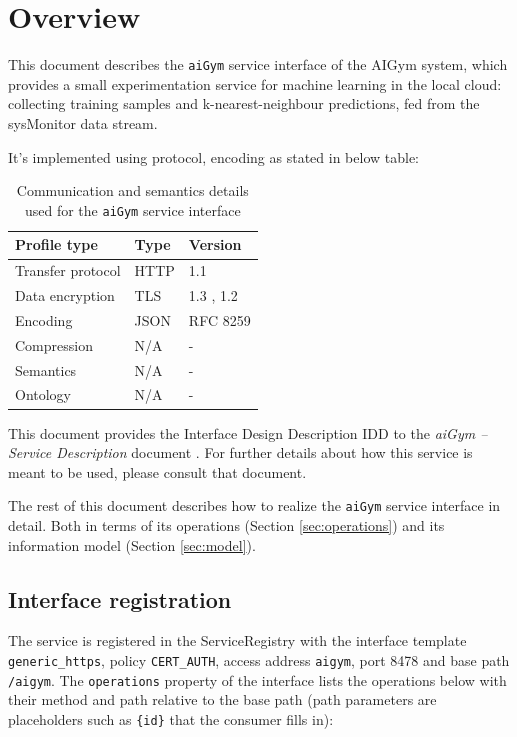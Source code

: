 \documentclass[a4paper]{arrowhead}
\begin{document}
\section{Overview}
\label{sec:overview}

This document describes the \texttt{aiGym} service interface of the AIGym system, which provides a small experimentation service for machine learning in the local cloud: collecting training samples and k-nearest-neighbour predictions, fed from the sysMonitor data stream.

It's implemented using protocol, encoding as stated in below table:
\begin{table}[ht!]
  \centering
  \begin{tabular}{|l|l|l|}
    \hline
    \rowcolor{gray!33} Profile type & Type & Version \\ \hline
    Transfer protocol & HTTP & 1.1 \cite{rfc9112} \\ \hline
    Data encryption & TLS & 1.3 \cite{rfc8446}, 1.2 \cite{rfc5246} \\ \hline
    Encoding & JSON & RFC 8259 \cite{rfc8259} \\ \hline
    Compression & N/A & - \\ \hline
    Semantics & N/A & - \\ \hline
    Ontology & N/A & - \\ \hline
  \end{tabular}
  \caption{Communication and semantics details used for the \texttt{aiGym} service interface}
  \label{tab:comunication_semantics_profile}
\end{table}

This document provides the Interface Design Description IDD to the \textit{aiGym -- Service Description} document \cite{aig-aiGym-sd}.
For further details about how this service is meant to be used, please consult that document.

The rest of this document describes how to realize the \texttt{aiGym} service
interface in detail. Both in terms of its operations (Section \ref{sec:operations}) and its information model (Section \ref{sec:model}).

\subsection{Interface registration}

The service is registered in the ServiceRegistry with the interface template \texttt{generic\_\allowbreak{}https}, policy \texttt{CERT\_\allowbreak{}AUTH}, access address \texttt{aigym}, port 8478 and base path \texttt{/\allowbreak{}aigym}. The \texttt{operations} property of the interface lists the operations below with their method and path relative to the base path (path parameters are placeholders such as \texttt{\{id\}} that the consumer fills in):
\end{document}

